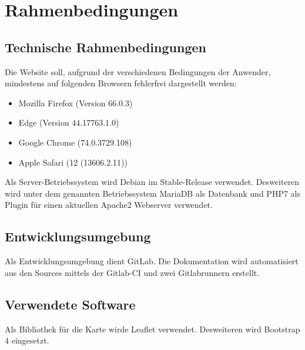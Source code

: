 \chapter{Rahmenbedingungen}


\section{Technische Rahmenbedingungen}
Die Website soll, aufgrund der verschiedenen Bedingungen der Anwender, mindestens auf folgenden Browsern fehlerfrei dargestellt werden:
\begin{itemize}
\item Mozilla Firefox (Version 66.0.3)
\item Edge (Version 44.17763.1.0)
\item Google Chrome (74.0.3729.108)
\item Apple Safari (12 (13606.2.11))
\end{itemize}
\vspace{\baselineskip}
Als Server-Betriebssystem wird Debian im Stable-Release verwendet. Desweiteren wird unter dem genannten Betriebssystem MariaDB als Datenbank und PHP7 als Plugin für einen aktuellen Apache2 Webserver verwendet.

\section{Entwicklungsumgebung}
Als Entwicklungsumgebung dient GitLab. Die Dokumentation wird automatisiert aus den Sources mittels der Gitlab-CI und zwei Gitlabrunnern erstellt.

\section{Verwendete Software}
Als Bibliothek für die Karte wirde Leaflet verwendet. Desweiteren wird Bootstrap 4 eingesetzt.
